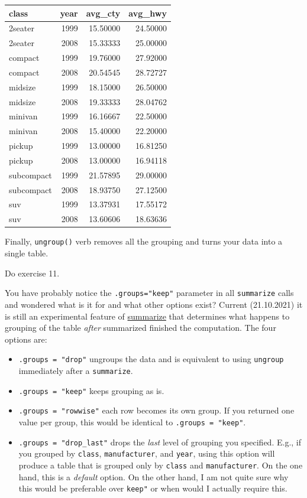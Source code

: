 \documentclass[
]{book}
\providecommand{\tightlist}{%
  \setlength{\itemsep}{0pt}\setlength{\parskip}{0pt}}
\begin{document}
\begin{tabular}{l|r|r|r}
\hline
class & year & avg\_cty & avg\_hwy\\
\hline
2seater & 1999 & 15.50000 & 24.50000\\
\hline
2seater & 2008 & 15.33333 & 25.00000\\
\hline
compact & 1999 & 19.76000 & 27.92000\\
\hline
compact & 2008 & 20.54545 & 28.72727\\
\hline
midsize & 1999 & 18.15000 & 26.50000\\
\hline
midsize & 2008 & 19.33333 & 28.04762\\
\hline
minivan & 1999 & 16.16667 & 22.50000\\
\hline
minivan & 2008 & 15.40000 & 22.20000\\
\hline
pickup & 1999 & 13.00000 & 16.81250\\
\hline
pickup & 2008 & 13.00000 & 16.94118\\
\hline
subcompact & 1999 & 21.57895 & 29.00000\\
\hline
subcompact & 2008 & 18.93750 & 27.12500\\
\hline
suv & 1999 & 13.37931 & 17.55172\\
\hline
suv & 2008 & 13.60606 & 18.63636\\
\hline
\end{tabular}

Finally, \texttt{ungroup()} verb removes all the grouping and turns your data into a single table.

Do exercise 11.

You have probably notice the \texttt{.groups="keep"} parameter in all \texttt{summarize} calls and wondered what is it for and what other options exist? Current (21.10.2021) it is still an experimental feature of \href{https://dplyr.tidyverse.org/reference/summarise.html}{summarize} that determines what happens to grouping of the table \emph{after} summarized finished the computation. The four options are:

\begin{itemize}
\tightlist
\item
  \texttt{.groups\ =\ "drop"} ungroups the data and is equivalent to using \texttt{ungroup} immediately after a \texttt{summarize}.
\item
  \texttt{.groups\ =\ "keep"} keeps grouping as is.
\item
  \texttt{.groups\ =\ "rowwise"} each row becomes its own group. If you returned one value per group, this would be identical to \texttt{.groups\ =\ "keep"}.
\item
  \texttt{.groups\ =\ "drop\_last"} drops the \emph{last} level of grouping you specified. E.g., if you grouped by \texttt{class}, \texttt{manufacturer}, and \texttt{year}, using this option will produce a table that is grouped only by \texttt{class} and \texttt{manufacturer}. On the one hand, this is a \emph{default} option. On the other hand, I am not quite sure why this would be preferable over \texttt{keep"} or when would I actually require this.
\end{itemize}
\end{document}
